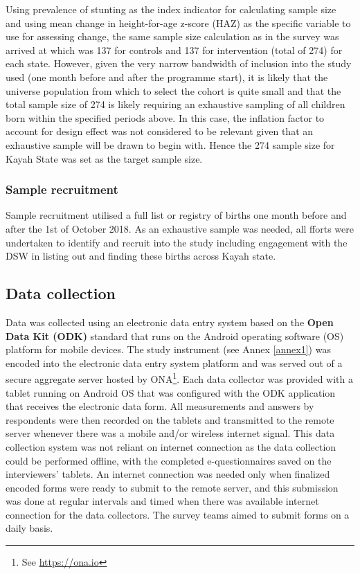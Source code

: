 \documentclass[12pt,a4paper]{article}
\let\rmarkdownfootnote\footnote%
\def\footnote{\protect\rmarkdownfootnote}
\begin{document}
Using prevalence of stunting as the index indicator for calculating sample size and using mean change in height-for-age z-score (HAZ) as the specific variable to use for assessing change, the same sample size calculation as in the survey was arrived at which was 137 for controls and 137 for intervention (total of 274) for each state.
However, given the very narrow bandwidth of inclusion into the study used (one month before and after the programme start), it is likely that the universe population from which to select the cohort is quite small and that the total sample size of 274 is likely requiring an exhaustive sampling of all children born within the specified periods above. In this case, the inflation factor to account for design effect was not considered to be relevant given that an exhaustive sample will be drawn to begin with. Hence the 274 sample size for Kayah State was set as the target sample size.

\hypertarget{sample-recruitment}{%
\subsubsection{Sample recruitment}\label{sample-recruitment}}

Sample recruitment utilised a full list or registry of births one month before and after the 1st of October 2018. As an exhaustive sample was needed, all fforts were undertaken to identify and recruit into the study including engagement with the DSW in listing out and finding these births across Kayah state.

\hypertarget{data-collection}{%
\subsection{Data collection}\label{data-collection}}

Data was collected using an electronic data entry system based on the \textbf{Open Data Kit (ODK)} standard that runs on the Android operating software (OS) platform for mobile devices. The study instrument (see Annex \ref{annex1}) was encoded into the electronic data entry system platform and was served out of a secure aggregate server hosted by ONA\footnote{See \url{https://ona.io}}. Each data collector was provided with a tablet running on Android OS that was configured with the ODK application that receives the electronic data form. All measurements and answers by respondents were then recorded on the tablets and transmitted to the remote server whenever there was a mobile and/or wireless internet signal. This data collection system was not reliant on internet connection as the data collection could be performed offline, with the completed e-questionnaires saved on the interviewers' tablets. An internet connection was needed only when finalized encoded forms were ready to submit to the remote server, and this submission was done at regular intervals and timed when there was available internet connection for the data collectors. The survey teams aimed to submit forms on a daily basis.
\end{document}
